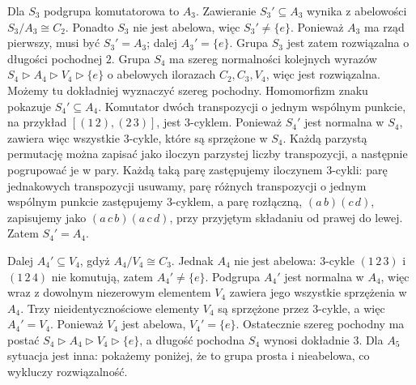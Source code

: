 \begin{przyklad}[Grupy $S_3$, $S_4$ i $A_5$]
Dla $S_3$ podgrupa komutatorowa to $A_3$.
Zawieranie $S_3'\subseteq A_3$ wynika z abelowości
$S_3/A_3\cong C_2$. Ponadto $S_3$ nie jest abelowa,
więc $S_3'\ne\{e\}$. Ponieważ $A_3$ ma rząd pierwszy,
musi być $S_3'=A_3$; dalej $A_3'=\{e\}$.
Grupa $S_3$ jest zatem rozwiązalna o długości pochodnej $2$.
Grupa $S_4$ ma szereg normalności kolejnych wyrazów
$S_4\triangleright A_4\triangleright V_4\triangleright\{e\}$
o abelowych ilorazach $C_2,C_3,V_4$, więc jest rozwiązalna.
Możemy tu dokładniej wyznaczyć szereg pochodny.
Homomorfizm znaku pokazuje $S_4'\subseteq A_4$.
Komutator dwóch transpozycji o jednym wspólnym punkcie,
na przykład $[(1\,2),(2\,3)]$, jest $3$-cyklem.
Ponieważ $S_4'$ jest normalna w $S_4$, zawiera więc
wszystkie $3$-cykle, które są sprzężone w $S_4$.
Każdą parzystą permutację można zapisać jako iloczyn
parzystej liczby transpozycji, a następnie pogrupować je w pary.
Każdą taką parę zastępujemy iloczynem $3$-cykli:
parę jednakowych transpozycji usuwamy, parę różnych
transpozycji o jednym wspólnym punkcie zastępujemy
$3$-cyklem, a parę rozłączną, $(a\,b)(c\,d)$, zapisujemy
jako $(a\,c\,b)(a\,c\,d)$, przy przyjętym składaniu
od prawej do lewej. Zatem $S_4'=A_4$.

Dalej $A_4'\subseteq V_4$, gdyż $A_4/V_4\cong C_3$.
Jednak $A_4$ nie jest abelowa: $3$-cykle $(1\,2\,3)$
i $(1\,2\,4)$ nie komutują, zatem $A_4'\ne\{e\}$.
Podgrupa $A_4'$ jest normalna w $A_4$, więc wraz
z dowolnym niezerowym elementem $V_4$ zawiera jego
wszystkie sprzężenia w $A_4$. Trzy nieidentycznościowe
elementy $V_4$ są sprzężone przez $3$-cykle,
a więc $A_4'=V_4$. Ponieważ $V_4$ jest abelowa,
$V_4'=\{e\}$. Ostatecznie szereg pochodny ma postać
$S_4\triangleright A_4\triangleright V_4\triangleright\{e\}$,
a długość pochodna $S_4$ wynosi dokładnie $3$.
Dla $A_5$ sytuacja jest inna: pokażemy poniżej,
że to grupa prosta i nieabelowa, co wykluczy rozwiązalność.
\end{przyklad}


